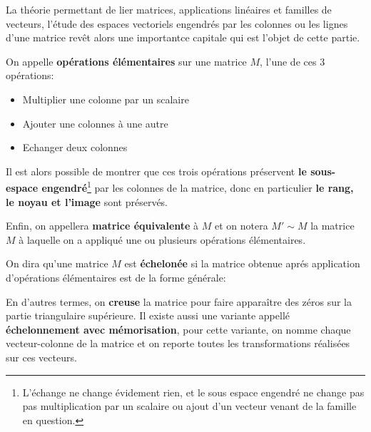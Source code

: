 La théorie permettant de lier matrices, applications linéaires et familles de vecteurs, l'étude des espaces vectoriels engendrés par les colonnes ou les lignes d'une matrice revêt alors une importantce capitale qui est l'objet de cette partie.\<

On appelle \textbf{opérations élémentaires} sur une matrice \(M\), l'une de ces 3 opérations:
\begin{itemize}
   \item Multiplier une colonne par un scalaire
   \item Ajouter une colonnes à une autre
   \item Echanger deux colonnes
\end{itemize}
Il est alors possible de montrer que ces trois opérations préservent \textbf{le sous-espace engendré}\footnote[1]{L'échange ne change évidement rien, et le sous espace engendré ne change pas pas multiplication par un scalaire ou ajout d'un vecteur venant de la famille en question.} par les colonnes de la matrice, donc en particulier \textbf{le rang, le noyau et l'image} sont préservés.\<

Enfin, on appellera \textbf{matrice équivalente} à \(M\) et on notera \(M' \sim M\) la matrice \(M\) à laquelle on a appliqué une ou plusieurs opérations élémentaires.

On dira qu'une matrice \(M\) est \textbf{échelonée} si la matrice obtenue aprés application d'opérations élémentaires est de la forme générale:
\begin{center}
\end{center}
En d'autres termes, on \textbf{creuse} la matrice pour faire apparaître des zéros sur la partie triangulaire supérieure.\+
Il existe aussi une variante appellé \textbf{échelonnement avec mémorisation}, pour cette variante, on nomme chaque vecteur-colonne de la matrice et on reporte toutes les transformations réalisées sur ces vecteurs. \<

